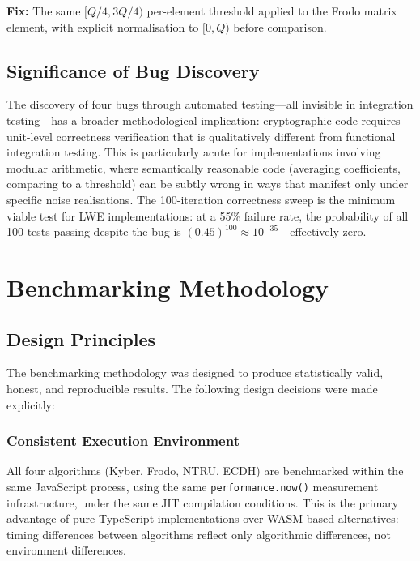 \documentclass[12pt,a4paper]{report}
\begin{document}
\textbf{Fix:} The same $[Q/4, 3Q/4)$ per-element threshold applied to the Frodo
matrix element, with explicit normalisation to $[0, Q)$ before comparison.

\section{Significance of Bug Discovery}

The discovery of four bugs through automated testing---all invisible in integration
testing---has a broader methodological implication: cryptographic code requires
unit-level correctness verification that is qualitatively different from functional
integration testing. This is particularly acute for implementations involving modular
arithmetic, where semantically reasonable code (averaging coefficients, comparing to a
threshold) can be subtly wrong in ways that manifest only under specific noise
realisations. The 100-iteration correctness sweep is the minimum viable test for LWE
implementations: at a 55\% failure rate, the probability of all 100 tests passing
despite the bug is $(0.45)^{100} \approx 10^{-35}$---effectively zero.

\chapter{Benchmarking Methodology}

\section{Design Principles}

The benchmarking methodology was designed to produce statistically valid, honest, and
reproducible results. The following design decisions were made explicitly:

\subsection{Consistent Execution Environment}

All four algorithms (Kyber, Frodo, NTRU, ECDH) are benchmarked within the same
JavaScript process, using the same \texttt{performance.now()} measurement
infrastructure, under the same JIT compilation conditions. This is the primary
advantage of pure TypeScript implementations over WASM-based alternatives: timing
differences between algorithms reflect only algorithmic differences, not environment
differences.
\end{document}
